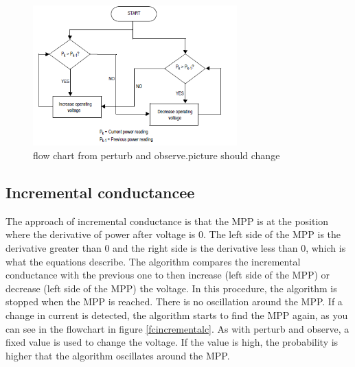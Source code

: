 \begin{figure}[htbp]
	\begin{center}
		\includegraphics[width=0.7\textwidth]{../Pictures/flow_chart_perturb_observe}
		\caption{flow chart from perturb and observe.picture should change }
		\label{fcperturbandobserve}
	\end{center}	
\end{figure}

\subsection{Incremental conductancee}
The approach of incremental conductance is that the MPP is at the position where the derivative of power after voltage is 0. The left side of the MPP is the derivative greater than 0 and the right side is the derivative less than 0, which is what the equations describe. The algorithm compares the incremental conductance with the previous one to then increase (left side of the MPP) or decrease (left side of the MPP) the voltage.  In this procedure, the algorithm is stopped when the MPP is reached. There is no oscillation around the MPP. If a change in current is detected, the algorithm starts to find the MPP again, as you can see in the flowchart in figure \ref{fcincrementalc}. As with perturb and observe, a fixed value is used to change the voltage. If the value is high, the probability is higher that the algorithm oscillates around the MPP. 

